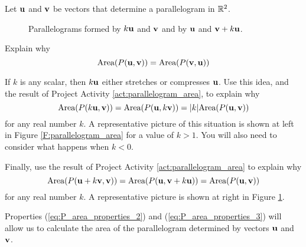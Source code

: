 \begin{pactivity} \label{act:P_area_properties} Let $\mathbf{u}$ and $\mathbf{v}$ be vectors that determine a parallelogram in $\mathbb{R}^2$. 
\begin{figure}[ht]
  \begin{center}
    \caption{Parallelograms formed by $k\mathbf{u}$ and $\mathbf{v}$ and by $\mathbf{u}$ and $\mathbf{v}+k\mathbf{u}$.}
    \label{F:area_propertities}
  \end{center}
\end{figure}

\ba
\item Explain why 
\begin{equation} \label{eq:P_area_properties_1}
\text{Area}(P(\mathbf{u},\mathbf{v})) = \text{Area}(P(\mathbf{v},\mathbf{u}))
\end{equation}


\item If $k$ is any scalar, then $k\mathbf{u}$ either stretches or compresses $\mathbf{u}$. Use this idea, and the result of Project Activity \ref{act:parallelogram_area}, to explain why
\begin{equation} \label{eq:P_area_properties_2}
\text{Area}(P(k\mathbf{u},\mathbf{v})) = \text{Area}(P(\mathbf{u},k\mathbf{v})) = |k| \text{Area}(P(\mathbf{u},\mathbf{v}))
\end{equation}
 for any real number $k$. A representative picture of this situation is shown at left in Figure \ref{F:parallelogram_area} for a value of $k > 1$. You will also need to consider what happens when $k < 0$. 
 
 
\item Finally, use the result of Project Activity \ref{act:parallelogram_area} to explain why
\begin{equation} \label{eq:P_area_properties_3}
\text{Area}(P(\mathbf{u}+k\mathbf{v},\mathbf{v})) = \text{Area}(P(\mathbf{u},\mathbf{v}+k\mathbf{u})) = \text{Area}(P(\mathbf{u},\mathbf{v}))
\end{equation}
for any real number $k$. A representative picture is shown at right in Figure \ref{F:area_propertities}.


\ea

\end{pactivity}


Properties (\ref{eq:P_area_properties_2}) and  (\ref{eq:P_area_properties_3}) will allow us to calculate the area of the parallelogram determined by vectors $\mathbf{u}$ and $\mathbf{v}$. 

